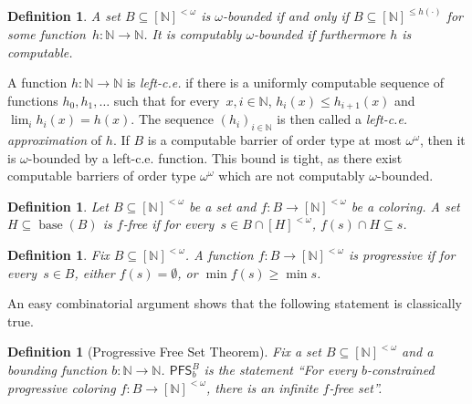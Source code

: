 \documentclass[10pt,a4paper]{article}
\newcommand{\PFS}[0]{\mathsf{PFS}}
\newcommand{\NN}[0]{\mathbb{N}}
\newcommand{\base}{\operatorname{base}}
\def\qt#1{``#1''}%
\numberwithin{theorem}{section}
\newtheorem{proposition}[theorem]{Proposition}
\newtheorem{definition}[theorem]{Definition}
\begin{document}
\begin{definition}
A set $B \subseteq [\NN]^{<\omega}$ is \emph{$\omega$-bounded} if and only if $B \subseteq [\NN]^{\leq h(\cdot)}$ for some function~$h : \NN \to \NN$. It is \emph{computably $\omega$-bounded} if furthermore $h$ is computable.
\end{definition}

A function $h : \NN \to \NN$ is \emph{left-c.e.} if there is a uniformly computable sequence of functions $h_0, h_1, \dots$ such that for every~$x, i \in \NN$, $h_i(x) \leq h_{i+1}(x)$ and $\lim_i h_i(x) = h(x)$. The sequence $(h_i)_{i\in\NN}$ is then called a \emph{left-c.e. approximation} of $h$.
If $B$ is a computable barrier of order type at most $\omega^\omega$, then it is $\omega$-bounded by a left-c.e. function. This bound is tight, as there exist computable barriers of order type $\omega^{\omega}$ which are not computably $\omega$-bounded.

\begin{definition}
Let $B \subseteq [\NN]^{<\omega}$ be a set and $f : B \to [\NN]^{<\omega}$ be a coloring.
A set~$H \subseteq \base(B)$ is \emph{$f$-free} if for every~$s \in B \cap [H]^{<\omega}$, $f(s) \cap H \subseteq s$.
\end{definition}

\begin{definition}
Fix $B \subseteq [\NN]^{<\omega}$.
A function $f : B \to [\NN]^{<\omega}$ is \emph{progressive} if for every~$s \in B$, either $f(s) = \emptyset$, or $\min f(s)\geq \min s$.
\end{definition}

An easy combinatorial argument shows that the following statement is classically true.


\begin{definition}[Progressive Free Set Theorem]
Fix a set $B \subseteq [\NN]^{<\omega}$ and a bounding function $b : \NN \to \NN$.
$\PFS^B_b$ is the statement \qt{For every $b$-constrained progressive coloring $f : B \to [\NN]^{<\omega}$, there is an infinite $f$-free set}.
\end{definition}

\end{document}
